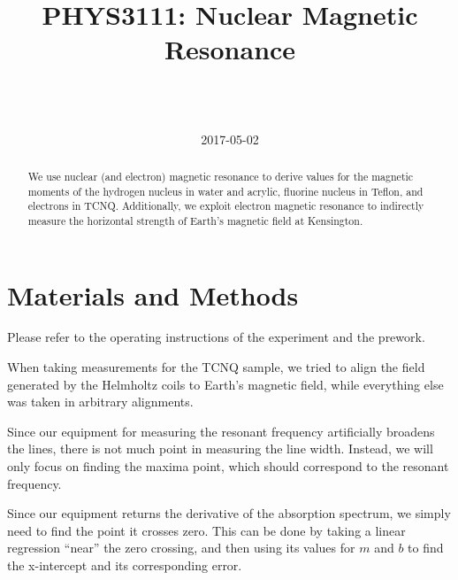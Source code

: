 \documentclass[a4paper]{scrartcl}
\begin{document}
\title{PHYS3111: Nuclear Magnetic Resonance}
\author{ \\ \\ }
\date{2017-05-02}
\maketitle

\begin{abstract}
    We use nuclear (and electron) magnetic resonance to derive values for the magnetic moments of the hydrogen nucleus in water and acrylic, fluorine nucleus in Teflon, and electrons in TCNQ. Additionally, we exploit electron magnetic resonance to indirectly measure the horizontal strength of Earth's magnetic field at Kensington.
\end{abstract}

\section{Materials and Methods}
Please refer to the operating instructions of the experiment and the prework.

When taking measurements for the TCNQ sample, we tried to align the field generated by the Helmholtz coils to Earth's magnetic field, while everything else was taken in arbitrary alignments.

Since our equipment for measuring the resonant frequency artificially broadens the lines, there is not much point in measuring the line width. Instead, we will only focus on finding the maxima point, which should correspond to the resonant frequency.

Since our equipment returns the derivative of the absorption spectrum, we simply need to find the point it crosses zero. This can be done by taking a linear regression ``near'' the zero crossing, and then using its values for \(m\) and \(b\) to find the x-intercept and its corresponding error.
\end{document}
